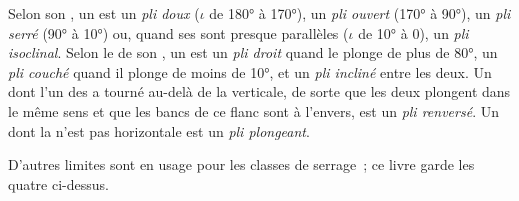 \begin{definition}\label{def:b1:faults-folds-fabrics:fold-classes}
Selon son , un  est un \emph{pli doux}
($\iota$ de \ang{180} à \ang{170}), un \emph{pli ouvert}
(\ang{170} à \ang{90}), un \emph{pli serré} (\ang{90} à
\ang{10}) ou, quand ses  sont presque parallèles ($\iota$ de \ang{10} à
$0$), un \emph{pli isoclinal}. Selon le  de son , un  est un \emph{pli droit} quand le  plonge de plus de \ang{80}, un \emph{pli couché}
quand il plonge de moins de \ang{10}, et un \emph{pli incliné}
entre les deux. Un  dont l'un des
 a tourné au-delà de la verticale, de sorte que les deux  plongent dans le même sens et que les
bancs de ce flanc sont à l'envers, est un \emph{pli renversé}.
Un  dont la  n'est pas horizontale est un \emph{pli
plongeant}.
\end{definition}
D'autres limites sont en usage pour les classes de serrage~; ce livre garde les
quatre ci-dessus.

